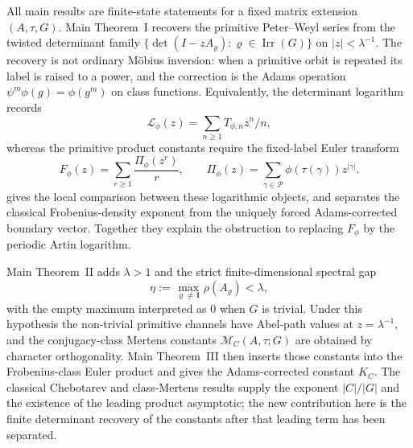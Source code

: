 \documentclass[11pt,a4paper]{amsart}
\theoremstyle{plain}
\theoremstyle{definition}
\theoremstyle{remark}
\DeclareMathOperator{\Irr}{Irr}
\begin{document}
All main results are finite-state statements for a fixed matrix extension
\((A,\tau,G)\).  Main Theorem~I recovers the primitive Peter--Weyl series
from the twisted determinant family
\(\{\det(I-zA_\varrho):\varrho\in\Irr(G)\}\) on
\(|z|<\lambda^{-1}\).  The recovery is not ordinary M\"obius inversion:
when a primitive orbit is repeated its label is raised to a power, and the
correction is the Adams operation \(\psi^m\phi(g)=\phi(g^m)\) on class
functions.  Equivalently, the determinant logarithm records
\[
  \mathcal L_\phi(z)=\sum_{n\ge1}T_{\phi,n}z^n/n,
\]
whereas the primitive product constants require the fixed-label Euler
transform
\[
  F_\phi(z)=\sum_{r\ge1}\frac{\Pi_\phi(z^r)}{r},
  \qquad
  \Pi_\phi(z)=\sum_{\gamma\in\mathcal P}
       \phi(\tau(\gamma))z^{|\gamma|}.
\]
 gives the local comparison
between these logarithmic objects, and 
separates the classical Frobenius-density exponent from the uniquely forced
Adams-corrected boundary vector.  Together they explain the obstruction to
replacing \(F_\phi\) by the periodic Artin logarithm.

Main Theorem~II adds \(\lambda>1\) and the strict finite-dimensional
spectral gap
\[
  \eta:=\max_{\varrho\ne\mathbf1}\rho(A_\varrho)<\lambda,
\]
with the empty maximum interpreted as \(0\) when \(G\) is trivial.  Under
this hypothesis the non-trivial primitive channels have Abel-path values at
\(z=\lambda^{-1}\), and the conjugacy-class Mertens constants
\(\mathcal M_C(A,\tau;G)\) are obtained by character orthogonality.
Main Theorem~III then inserts those constants into the Frobenius-class Euler
product and gives the Adams-corrected constant \(K_C\).  The classical
Chebotarev and class-Mertens results supply the exponent \(|C|/|G|\) and the
existence of the leading product asymptotic; the new contribution here is
the finite determinant recovery of the constants after that leading term has
been separated.
\end{document}
